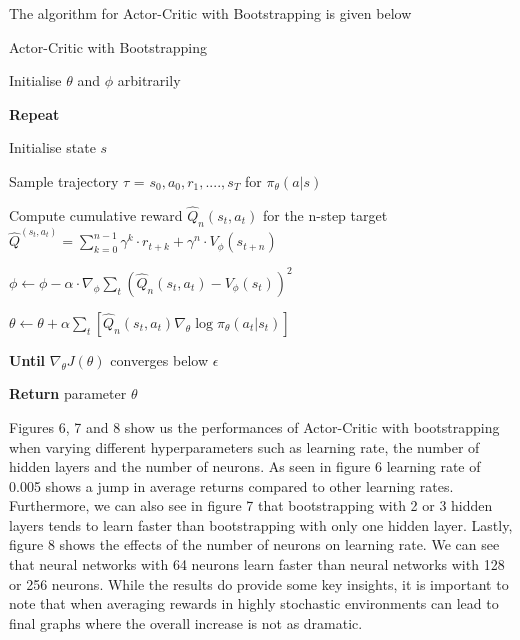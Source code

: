 \documentclass{article}
\begin{document}
The algorithm for Actor-Critic with Bootstrapping is given below \cite{plaat-deeprl}
\begin{algorithm}[htbp]
\caption{Actor-Critic with Bootstrapping}
\SetAlgoLined
\DontPrintSemicolon
\small %
Initialise $\theta$ and $\phi$ arbitrarily\;\\
\item \textbf{Repeat} \;\\
{
    \item Initialise state $s$\;
    \item Sample trajectory $\tau$ = ${s_0,a_0,r_1,....,s_T}$ for $\pi_\theta(a|s)$
     \item 
    {
     \item Compute cumulative reward $\hat{Q}_n(s_t,a_t)$ for the n-step target
     \newline \(\hat{Q}^(s_t,a_t) = \sum_{k=0}^{n-1}\gamma^k\cdot r_{t+k} + \gamma^{n} \cdot V_\phi (s_{t+n})\)
    }
}
    \item $\phi \leftarrow \phi - \alpha \cdot \nabla_\phi \sum_t (\hat{Q}_n(s_t, a_t) - V_\phi(s_t))^2$ \;
    \item $\theta \leftarrow \theta + \alpha \sum_t [\hat{Q}_n(s_t, a_t) \nabla_\theta \log \pi_\theta(a_t | s_t)]$\;
\item \textbf{Until} $\nabla_\theta J(\theta)$ converges below $\epsilon$ \;
\item \textbf{Return} parameter $\theta$
\end{algorithm}

Figures 6, 7 and 8 show us the performances of Actor-Critic with bootstrapping when varying different hyperparameters such as learning rate, the number of hidden layers and the number of neurons. \newline 
As seen in figure 6 learning rate of 0.005 shows a jump in average returns compared to other learning rates. Furthermore, we can also see in figure 7 that bootstrapping with 2 or 3 hidden layers tends to learn faster than bootstrapping with only one hidden layer. Lastly, figure 8 shows the effects of the number of neurons on learning rate. We can see that neural networks with 64 neurons learn faster than neural networks with 128 or 256 neurons. 
While the results do provide some key insights, it is important to note that when averaging rewards in highly stochastic environments can lead to final graphs where the overall increase is not as dramatic.
\end{document}
